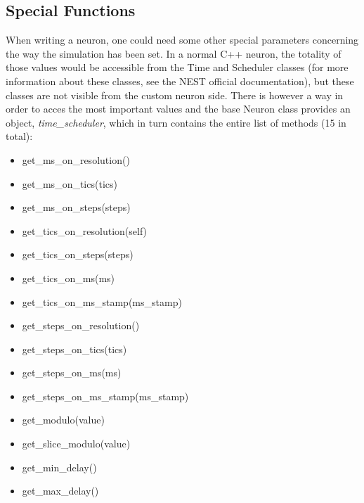 \documentclass{article}
\begin{document}
\subsection*{Special Functions}
When writing a neuron, one could need some other special parameters concerning the way the simulation has been set. In a normal C++ neuron, the totality of those values would be accessible from the Time and Scheduler classes (for more information about these classes, see the NEST official documentation), but these classes are not visible from the custom neuron side. 
There is however a way in order to acces the most important values and the base Neuron class provides an object, \emph{time\_scheduler}, which in turn contains the entire list of methods (15 in total):
\begin{itemize}
\item get\_ms\_on\_resolution()

\item get\_ms\_on\_tics(tics)

\item get\_ms\_on\_steps(steps)

\item get\_tics\_on\_resolution(self)

\item get\_tics\_on\_steps(steps)

\item get\_tics\_on\_ms(ms)
   
\item get\_tics\_on\_ms\_stamp(ms\_stamp)

\item get\_steps\_on\_resolution()

\item get\_steps\_on\_tics(tics)

\item get\_steps\_on\_ms(ms)

\item get\_steps\_on\_ms\_stamp(ms\_stamp)

\item get\_modulo(value)

\item get\_slice\_modulo(value)

\item get\_min\_delay()

\item get\_max\_delay()

\end{itemize}
\end{document}
